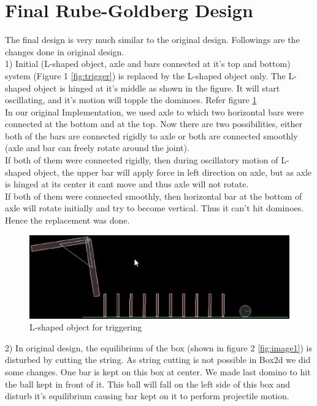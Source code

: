 \documentclass[a4paper,11pt]{article}
\begin{document}
\section{Final Rube-Goldberg Design}
{
\indent \indent The final design is very much similar to the original design. Followings are the changes done in original design. \\

1) Initial (L-shaped object, axle and bars connected at it's top and bottom) system (Figure 1 \ref{fig:trigger}) is replaced by the L-shaped object only. The L-shaped object is hinged at it's middle as shown in the figure. It will start oscillating, and it's motion will topple the dominoes. Refer figure \ref{fig:image4} \\
 In our original Implementation, we used axle to which two horizontal bars were connected at the bottom and at the top. Now there are two possibilities, either both of the bars are connected rigidly to axle or both are connected smoothly (axle and bar can freely rotate around the joint). \\
\indent If both of them were connected rigidly, then during oscillatory motion of L-shaped object, the upper bar will apply force in left direction on axle, but as axle is hinged at its center it cant move and thus axle will not rotate. \\
\indent If both of them were connected smoothly, then horizontal bar at the bottom of axle will rotate initially and try to become vertical. Thus it can't hit dominoes. Hence the replacement was done.

\begin{figure}[h]
    \centering
    \label{fig:image4}
    \includegraphics[scale=0.3]{image4}
    \caption{L-shaped object for triggering}
\end{figure}

2) In original design, the equilibrium of the box (shown in figure 2 \ref{fig:image1}) is disturbed by cutting the string. As string cutting is not possible in Box2d we did some changes. One bar is kept on this box at center. We made last domino to hit the ball kept in front of it. This ball will fall on the left side of this box and disturb it's equilibrium causing bar kept on it to perform projectile motion. 

}
\end{document}
